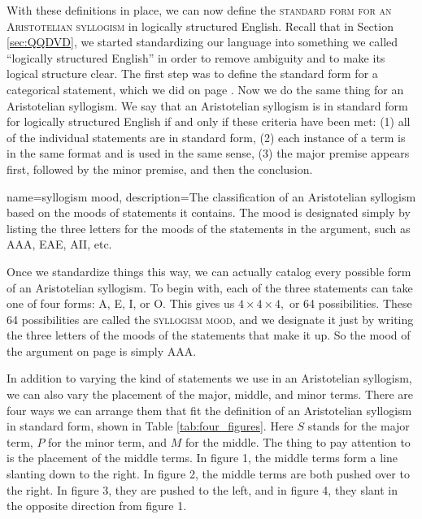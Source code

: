 With these definitions in place, we can now define the \textsc{\gls{standard form for an Aristotelian syllogism}} in logically structured English. \label{standard_form_for_an_Aristotelian_syllogism} Recall that in Section  \ref{sec:QQDVD}, we started standardizing our language into something we called ``logically structured English'' in order to remove ambiguity and to make its logical structure clear. The first step was to define the standard form for a categorical statement, which we did on page \pageref{def:standard_form_cat_statement}. Now we do the same thing for an Aristotelian syllogism. We say that an Aristotelian syllogism is in standard form for logically structured English if and only if these criteria have been met: (1) all of the individual statements are in standard form, (2) each instance of a term is in the same format and is used in the same sense, (3) the major premise appears first, followed by the minor premise, and then the conclusion.

{
name=syllogism mood,
description={The classification of an Aristotelian syllogism based on the moods of statements it contains. The mood is designated simply by listing the three letters for the moods of the statements in the argument, such as AAA, EAE, AII, etc.}
} 

Once we standardize things this way, we can actually catalog every possible form of an Aristotelian syllogism. To begin with, each of the three statements can take one of four forms: A, E, I, or O. This gives us $4 \times 4 \times 4,$ or 64 possibilities. These 64 possibilities are called the \textsc{\gls{syllogism mood}}, and we designate it just by writing the three letters of the moods of the statements that make it up. So the mood of the argument on page \pageref{AAA_arg} is simply AAA. 

In addition to varying the kind of statements we use in an Aristotelian syllogism, we can also vary the placement of the major, middle, and minor terms. There are four ways we can arrange them that fit the definition of an Aristotelian syllogism in standard form, shown in Table \ref{tab:four_figures}. Here $S$ stands for the major term, $P$ for the minor term, and $M$ for the middle. The thing to pay attention to is the placement of the middle terms. In figure 1, the middle terms form a line slanting down to the right. In figure 2, the middle terms are both pushed over to the right. In figure 3, they are pushed to the left, and in figure 4, they slant in the opposite direction from figure 1.


